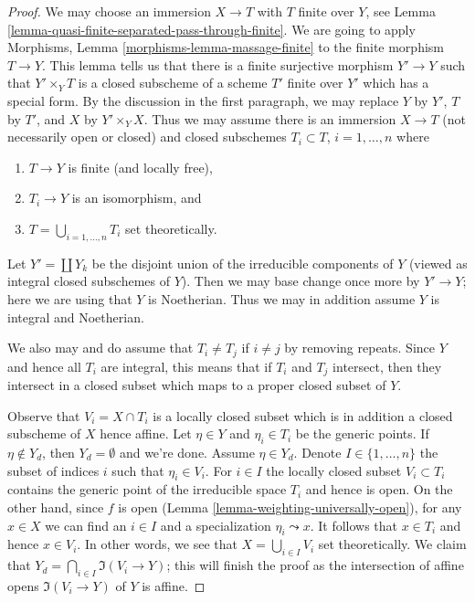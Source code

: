 \begin{proof}
\medskip\noindent
We may choose an immersion $X \to T$ with $T$ finite over $Y$, see Lemma
\ref{lemma-quasi-finite-separated-pass-through-finite}.
We are going to apply Morphisms, Lemma \ref{morphisms-lemma-massage-finite}
to the finite morphism $T \to Y$. This lemma tells us that
there is a finite surjective morphism $Y' \to Y$ such that
$Y' \times_Y T$ is a closed subscheme of a scheme $T'$ finite over $Y'$
which has a special form.
By the discussion in the first paragraph, we may replace $Y$ by $Y'$,
$T$ by $T'$, and $X$ by $Y' \times_Y X$.
Thus we may assume there is an immersion $X \to T$ (not necessarily
open or closed) and closed subschemes
$T_i \subset T$, $i = 1, \ldots, n$ where
\begin{enumerate}
\item $T \to Y$ is finite (and locally free),
\item $T_i \to Y$ is an isomorphism, and
\item $T = \bigcup_{i = 1, \ldots, n} T_i$ set theoretically.
\end{enumerate}
Let $Y' = \coprod Y_k$ be the disjoint union of the irreducible
components of $Y$ (viewed as integral closed subschemes of $Y$).
Then we may base change once more by $Y' \to Y$; here we
are using that $Y$ is Noetherian. Thus we may in
addition assume $Y$ is integral and Noetherian.

\medskip\noindent
We also may and do assume that $T_i \not = T_j$ if $i \not = j$ by
removing repeats. Since $Y$ and hence all $T_i$ are integral, this
means that if $T_i$ and $T_j$ intersect, then they intersect in a
closed subset which maps to a proper closed subset of $Y$.

\medskip\noindent
Observe that $V_i = X \cap T_i$ is a locally closed subset
which is in addition a closed subscheme of $X$ hence affine.
Let $\eta \in Y$ and $\eta_i \in T_i$ be the generic points.
If $\eta \not \in Y_d$, then $Y_d = \emptyset$ and we're done.
Assume $\eta \in Y_d$. Denote $I \in \{1, \ldots, n\}$
the subset of indices $i$ such that $\eta_i \in V_i$.
For $i \in I$ the locally closed subset $V_i \subset T_i$
contains the generic point of the irreducible space $T_i$
and hence is open. On the other hand, since $f$ is open
(Lemma \ref{lemma-weighting-universally-open}),
for any $x \in X$ we can find an $i \in I$ and a specialization
$\eta_i \leadsto x$. It follows that $x \in T_i$ and hence
$x \in V_i$. In other words, we see that $X = \bigcup_{i \in I} V_i$
set theoretically.
We claim that $Y_d = \bigcap_{i \in I} \Im(V_i \to Y)$; this will
finish the proof as the intersection of affine opens
$\Im(V_i \to Y)$ of $Y$ is affine.


\end{proof}
